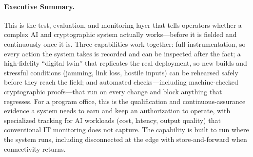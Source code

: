 \documentclass[11pt,letterpaper]{article}
\begin{document}
\makecover

\begin{abstract}
We present an integrated verification and validation (V\&V) framework combining continuous observability, behavioral analytics, ML pipeline orchestration, digital twin environments, and formal cryptographic proofs. The observability platform ingests logs, metrics, and distributed traces into a Datastore OLAP backend, with LLM-specific telemetry tracking token usage, cost, latency, and quality metrics across 100+ AI providers. Temporal workflows orchestrate LLM evaluation, trace clustering, and sentiment analysis, while Dagster DAGs manage ETL pipelines for training data preparation. A network simulation environment supports configurable topologies with 38 registered virtual machines, enabling mission rehearsal and system qualification. The framework includes 17 formal cryptographic proofs, 28+ consensus tests, and automated CI/CD with multi-platform builds. Anomaly detection, feature flag-controlled rollout, and A/B testing with statistical significance provide continuous data-driven decision support.
\end{abstract}

\paragraph{Executive Summary.}
This is the test, evaluation, and monitoring layer that tells operators whether a complex AI and cryptographic system actually works---before it is fielded and continuously once it is. Three capabilities work together: full instrumentation, so every action the system takes is recorded and can be inspected after the fact; a high-fidelity ``digital twin'' that replicates the real deployment, so new builds and stressful conditions (jamming, link loss, hostile inputs) can be rehearsed safely before they reach the field; and automated checks---including machine-checked cryptographic proofs---that run on every change and block anything that regresses. For a program office, this is the qualification and continuous-assurance evidence a system needs to earn and keep an authorization to operate, with specialized tracking for AI workloads (cost, latency, output quality) that conventional IT monitoring does not capture. The capability is built to run where the system runs, including disconnected at the edge with store-and-forward when connectivity returns.

\tableofcontents
\newpage

\end{document}
